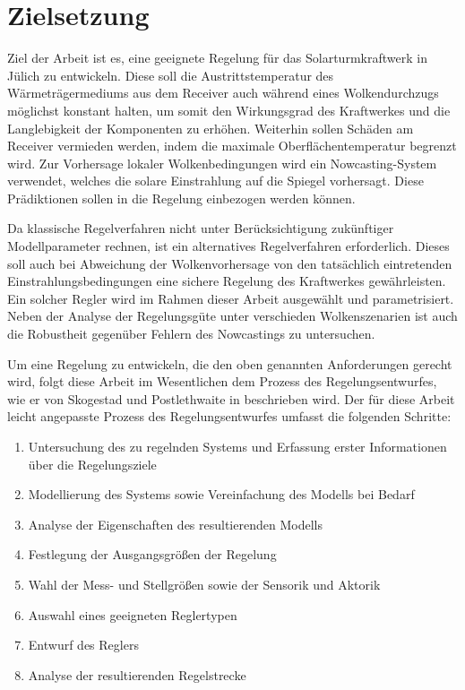 \section{Zielsetzung} \label{sec_Zielsetzung}
Ziel der Arbeit ist es, eine geeignete Regelung für das Solarturmkraftwerk in Jülich zu entwickeln.
Diese soll die Austrittstemperatur des Wärmeträgermediums aus dem Receiver auch während eines Wolkendurchzugs möglichst konstant halten, um somit den Wirkungsgrad des Kraftwerkes und die Langlebigkeit der Komponenten zu erhöhen.
Weiterhin sollen Schäden am Receiver vermieden werden, indem die maximale Oberflächentemperatur begrenzt wird.
Zur Vorhersage lokaler Wolkenbedingungen wird ein Nowcasting-System verwendet, welches die solare Einstrahlung auf die Spiegel vorhersagt.
Diese Prädiktionen sollen in die Regelung einbezogen werden können.

Da klassische Regelverfahren nicht unter Berücksichtigung zukünftiger Modellparameter rechnen, ist ein alternatives Regelverfahren erforderlich.
Dieses soll auch bei Abweichung der Wolkenvorhersage von den tatsächlich eintretenden Einstrahlungsbedingungen eine sichere Regelung des Kraftwerkes gewährleisten.
Ein solcher Regler wird im Rahmen dieser Arbeit ausgewählt und parametrisiert.
Neben der Analyse der Regelungsgüte unter verschieden Wolkenszenarien ist auch die Robustheit gegenüber Fehlern des Nowcastings zu untersuchen.

Um eine Regelung zu entwickeln, die den oben genannten Anforderungen gerecht wird, folgt diese Arbeit im Wesentlichen dem Prozess des Regelungsentwurfes, wie er von Skogestad und Postlethwaite in \cite[S.1]{Skogestad} beschrieben wird.
Der für diese Arbeit leicht angepasste Prozess des Regelungsentwurfes umfasst die folgenden Schritte:
\begin{enumerate}
    \item Untersuchung des zu regelnden Systems und Erfassung erster Informationen über die Regelungsziele
    \item Modellierung des Systems sowie Vereinfachung des Modells bei Bedarf
    \item Analyse der Eigenschaften des resultierenden Modells
    \item Festlegung der Ausgangsgrößen der Regelung
    \item Wahl der Mess- und Stellgrößen sowie der Sensorik und Aktorik
    \item Auswahl eines geeigneten Reglertypen
    \item Entwurf des Reglers
    \item Analyse der resultierenden Regelstrecke
\end{enumerate}


